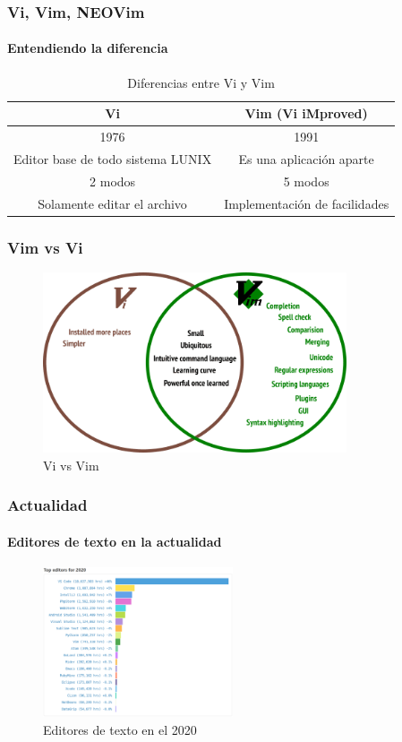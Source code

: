 \documentclass{beamer}
\begin{document}
  \begin{frame}[t]
    \frametitle{Vi, Vim, NEOVim}
    \framesubtitle{Entendiendo la diferencia}
    \begin{table}[h]
      \centering
      \caption{Diferencias entre Vi y Vim}
      \label{tab:label}
    \begin{tabular}{|c|c|}
        \hline
        \bf{Vi} & \bf{Vim (Vi iMproved)} \\ 
        \hline
        1976 & 1991\\
        \hline
        Editor base de todo sistema LUNIX & Es una aplicación aparte\\
        \hline
        2 modos & 5 modos \\
        \hline
        Solamente editar el archivo & Implementación de facilidades \\ 
        \hline
      \end{tabular}
    \end{table}
  \end{frame}

  \begin{frame}[t]
    \frametitle{Vim vs Vi} 
    \begin{figure}[h]
      \centering
      \includegraphics[width=0.8\textwidth]{./resources/5.png}
      \caption{Vi vs Vim}
      \label{fig:}
    \end{figure}
  \end{frame}

  \begin{frame}[t]
    \frametitle{Actualidad}
    \framesubtitle{Editores de texto en la actualidad}
    \begin{figure}[h]
      \centering
      \includegraphics[width=0.5\textwidth]{./resources/4.png}
      \caption{Editores de texto en el 2020}
      \label{fig:2}
    \end{figure}
  \end{frame}
\end{document}
